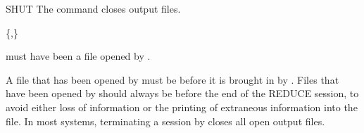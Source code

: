 \begin{Command}[shut]{SHUT}
The  command closes output files.
\begin{Syntax}
 \{,\}\optional
\end{Syntax}

 must have been a file opened by .

\begin{Comments}
A file that has been opened by  must be  before it is
brought in by .  Files that have been opened by  should
always be  before the end of the REDUCE session, to avoid either
loss of information or the printing of extraneous information into the file.  
In most systems, terminating a session by  closes all open
output files.
\end{Comments}
\end{Command}


